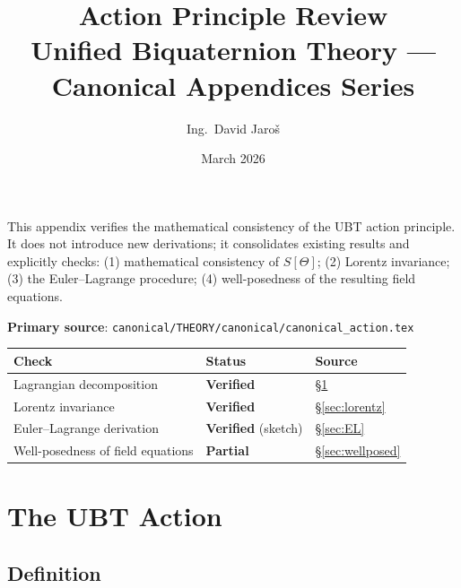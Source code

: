 \documentclass[11pt,a4paper]{article}
\title{\textbf{Action Principle Review}\\
\large Unified Biquaternion Theory — Canonical Appendices Series}
\author{Ing.\ David Jaroš}
\date{March 2026}
\theoremstyle{definition}
\theoremstyle{remark}
\begin{document}
\maketitle
\tableofcontents
\bigskip

\begin{tcolorbox}[colback=blue!4!white,colframe=blue!50!black,title=Purpose]
This appendix verifies the mathematical consistency of the UBT action
principle. It does not introduce new derivations; it consolidates existing
results and explicitly checks: (1) mathematical consistency of
$S[\Theta]$; (2) Lorentz invariance; (3) the Euler--Lagrange procedure;
(4) well-posedness of the resulting field equations.

\medskip
\textbf{Primary source}:
\texttt{canonical/THEORY/canonical/canonical\_action.tex}

\medskip
\begin{tabular}{lll}
\hline
Check & Status & Source \\
\hline
Lagrangian decomposition & \textbf{Verified} & \S\ref{sec:action} \\
Lorentz invariance & \textbf{Verified} & \S\ref{sec:lorentz} \\
Euler--Lagrange derivation & \textbf{Verified} (sketch) & \S\ref{sec:EL} \\
Well-posedness of field equations & \textbf{Partial} & \S\ref{sec:wellposed} \\
\hline
\end{tabular}
\end{tcolorbox}

\section{The UBT Action}\label{sec:action}

\subsection{Definition}
\end{document}
